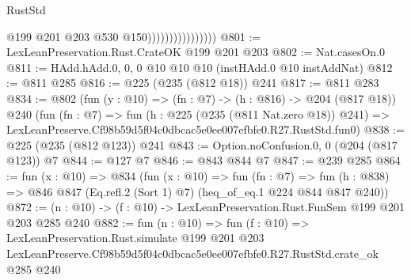 \begin{lexlean}{RustStd}
\begin{coremodule}
                                    @199
                                    @201
                                    @203
                                    @530
                                    @150))))))))))))))))
@801 := LexLeanPreservation.Rust.CrateOK @199 @201 @203
@802 := Nat.casesOn.{0}
@811 := HAdd.hAdd.{0, 0, 0} @10 @10 @10 (instHAdd.{0} @10 instAddNat)
@812 := @811 @285
@816 := @225 (@235 (@812 @18)) @241
@817 := @811 @283
@834 := @802
    (fun (y : @10) => (fn : @7) -> (h : @816) -> @204 (@817 @18))
    @240
    (fun (fn : @7) =>
    fun (h : @225 (@235 (@811 Nat.zero @18)) @241) =>
    LexLeanPreserve.Cf98b59d5f04c0dbcac5e0ee007efbfe0.R27.RustStd.fun0)
@838 := @225 (@235 (@812 @123)) @241
@843 := Option.noConfusion.{0, 0} (@204 (@817 @123)) @7
@844 := @127 @7
@846 := @843 @844 @7
@847 := @239 @285
@864 := fun (x : @10) =>
  @834
    (fun (x : @10) =>
    fun (fn : @7) =>
    fun (h : @838) => @846 @847 (Eq.refl.{2} (Sort 1) @7) (heq_of_eq.{1} @224 @844 @847 @240))
@872 := (n : @10) -> (f : @10) -> LexLeanPreservation.Rust.FunSem @199 @201 @203 @285 @240
@882 := fun (n : @10) =>
  fun (f : @10) =>
  LexLeanPreservation.Rust.simulate
    @199
    @201
    @203
    LexLeanPreserve.Cf98b59d5f04c0dbcac5e0ee007efbfe0.R27.RustStd.crate_ok
    @285
    @240
\end{coremodule}
\end{lexlean}

